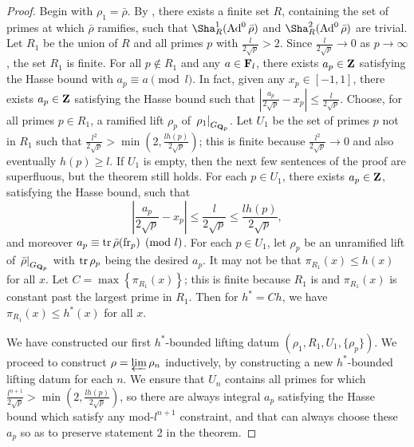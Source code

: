 \begin{proof}
Begin with $\rho_1= \bar\rho$. By \cite[Lem.~6]{khare-larsen-ramakrishna-2005}, 
there exists a finite set $R$, containing the set of primes at which $\bar\rho$ 
ramifies, such that $\Sha_R^1(\Ad^0\bar\rho)$ and $\Sha_R^2(\Ad^0\bar\rho)$ are 
trivial. 
Let $R_1$ be the union of $R$ and all primes $p$ with 
$\frac{l}{2\sqrt p} > 2$. Since $\frac{l}{2\sqrt p} \to 0$ as $p\to \infty$, 
the set $R_1$ is finite. For all $p\notin R_1$ and any $a\in \mathbf{F}_l$, there 
exists $a_p\in \mathbf{Z}$ satisfying the Hasse bound with $a_p\equiv a\pmod l$. In 
fact, given any $x_p\in [-1,1]$, there exists $a_p\in \mathbf{Z}$ satisfying the Hasse 
bound such that 
$\left| \frac{a_p}{2\sqrt p} - x_p\right| \leqslant \frac{l}{2\sqrt p}$.
Choose, for all primes $p\in R_1$, a ramified 
lift $\rho_p$ of $\left. \rho_1\right|_{G_{\mathbf{Q}_p}}$. Let $U_1$ be the set of 
primes $p$ not in $R_1$ such that 
$\frac{l^2}{2\sqrt p} > \min\left(2, \frac{l h(p)}{2\sqrt p}\right)$; this is 
finite because $\frac{l^2}{2\sqrt p} \to 0$ and also eventually 
$h(p) \geqslant l$. If $U_1$ is empty, then the next few sentences of the 
proof are superfluous, but the theorem still holds. 
For each $p\in U_1$, there exists $a_p\in \mathbf{Z}$, satisfying the 
Hasse bound, such that 
\[
	\left| \frac{a_p}{2\sqrt p} - x_p\right| \leqslant \frac{l}{2\sqrt p} \leqslant \frac{l h(p)}{2\sqrt p} ,
\]
and moreover $a_p\equiv \operatorname{tr}\bar\rho(\mathrm{fr}_p)\pmod l$. For each $p\in U_1$, let 
$\rho_p$ be an unramified lift of $\left.\bar\rho\right|_{G_{\mathbf{Q}_p}}$ with 
$\operatorname{tr}\rho_p$ being the desired $a_p$. It may not be that 
$\pi_{R_1}(x) \leqslant h(x)$ for all $x$. Let 
$C = \max\left\{\pi_{R_1}(x)\right\}$; this is finite because 
$R_1$ is and $\pi_{R_1}(x)$ is constant past the largest prime in $R_1$. Then 
for $h^\ast = C h$, we have $\pi_{R_1}(x) \leqslant h^\ast(x)$ for all $x$. 

We have constructed our first $h^\ast$-bounded lifting datum 
$(\rho_1,R_1,U_1,\{\rho_p\})$. We proceed to construct 
$\rho = \varprojlim \rho_n$ inductively, by constructing a new $h^\ast$-bounded 
lifting datum for each $n$. We ensure that $U_n$ contains all primes for which 
$\frac{l^{n+1}}{2\sqrt p} > \min\left(2, \frac{l h(p)}{2\sqrt p}\right)$, so 
there are always integral $a_p$ satisfying the Hasse bound which satisfy any 
mod-$l^{n+1}$ constraint, and that can always choose these $a_p$ so as to 
preserve statement 2 in the theorem. 


\end{proof}
